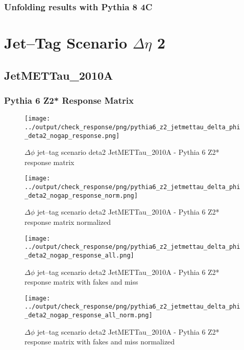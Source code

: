 \documentclass[11pt]{book}
\begin{document}
\clearpage
\subsection{Unfolding results with Pythia 8 4C}


\newpage
\chapter{Jet--Tag Scenario $\Delta\eta$ 2}
\section{JetMETTau\_2010A}
\subsection{Pythia 6 Z2* Response Matrix}

\begin{figure}[ht]
\centering
\texttt{[image: ../output/check\_response/png/pythia6\_z2\_jetmettau\_delta\_phi\_deta2\_nogap\_response.png]}
\caption{$\Delta\phi$ jet--tag scenario deta2 JetMETTau\_2010A - Pythia 6 Z2* response matrix}
\label{p6_jetmettau_delta_phi_deta2_nogap_response}
\end{figure}

\begin{figure}[ht]
\centering
\texttt{[image: ../output/check\_response/png/pythia6\_z2\_jetmettau\_delta\_phi\_deta2\_nogap\_response\_norm.png]}
\caption{$\Delta\phi$ jet--tag scenario deta2 JetMETTau\_2010A - Pythia 6 Z2* response matrix normalized}
\label{p6_jetmettau_delta_phi_deta2_nogap_response_norm}
\end{figure}

\begin{figure}[ht]
\centering
\texttt{[image: ../output/check\_response/png/pythia6\_z2\_jetmettau\_delta\_phi\_deta2\_nogap\_response\_all.png]}
\caption{$\Delta\phi$ jet--tag scenario deta2 JetMETTau\_2010A - Pythia 6 Z2* response matrix with fakes and miss}
\label{p6_jetmettau_delta_phi_deta2_nogap_response_all}
\end{figure}

\begin{figure}[ht]
\centering
\texttt{[image: ../output/check\_response/png/pythia6\_z2\_jetmettau\_delta\_phi\_deta2\_nogap\_response\_all\_norm.png]}
\caption{$\Delta\phi$ jet--tag scenario deta2 JetMETTau\_2010A - Pythia 6 Z2* response matrix with fakes and miss normalized}
\label{p6_jetmettau_delta_phi_deta2_nogap_response_all_norm}
\end{figure}
\end{document}
